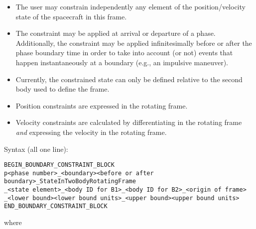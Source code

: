 \documentclass[11pt]{article}
\begin{document}
\begin{itemize}
	\item The user may constrain independently any element of the position/velocity state of the spacecraft in this frame.
	\item The constraint may be applied at arrival or departure of a phase. Additionally, the constraint may be applied infinitesimally before or after the phase boundary time in order to take into account (or not) events that happen instantaneously at a boundary (e.g., an impulsive maneuver).
	\item Currently, the constrained state can only be defined relative to the second body used to define the frame.
	\item Position constraints are expressed in the rotating frame.
	\item Velocity constraints are calculated by differentiating in the rotating frame \emph{and} expressing the velocity in the rotating frame.
\end{itemize} 

Syntax (all one line):

\begin{verbatim}
BEGIN_BOUNDARY_CONSTRAINT_BLOCK
p<phase number>_<boundary><before or after boundary>_StateInTwoBodyRotatingFrame
_<state element>_<body ID for B1>_<body ID for B2>_<origin of frame>
_<lower bound><lower bound units>_<upper bound><upper bound units>
END_BOUNDARY_CONSTRAINT_BLOCK
\end{verbatim}

where
\end{document}
